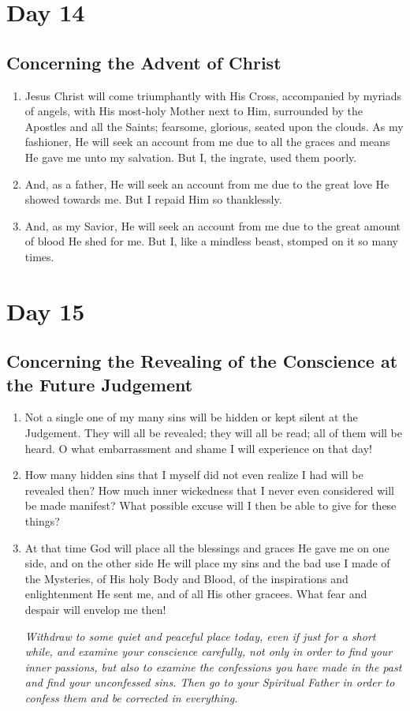 \documentclass[11pt]{article}
\begin{document}
\section*{Day 14}
\label{sec:orgdf59854}
\subsection*{Concerning the Advent of Christ}
\label{sec:org2060591}
\begin{enumerate}
\item Jesus Christ will come triumphantly with His Cross, accompanied by myriads of angels, with His most-holy Mother next to Him, surrounded by the Apostles and all the Saints; fearsome, glorious, seated upon the clouds. As my fashioner, He will seek an account from me due to all the graces and means He gave me unto my salvation. But I, the ingrate, used them poorly.
\item And, as a father, He will seek an account from me due to the great love He showed towards me. But I repaid Him so thanklessly.
\item And, as my Savior, He will seek an account from me due to the great amount of blood He shed for me. But I, like a mindless beast, stomped on it so many times.
\end{enumerate}
\section*{Day 15}
\label{sec:org88918b5}
\subsection*{Concerning the Revealing of the Conscience at the Future Judgement}
\label{sec:org435ac32}
\begin{enumerate}
\item Not a single one of my many sins will be hidden or kept silent at the Judgement. They will all be revealed; they will all be read; all of them will be heard. O what embarrassment and shame I will experience on that day!
\item How many hidden sins that I myself did not even realize I had will be revealed then? How much inner wickedness that I never even considered will be made manifest? What possible excuse will I then be able to give for these things?
\item At that time God will place all the blessings and graces He gave me on one side, and on the other side He will place my sins and the bad use I made of the Mysteries, of His holy Body and Blood, of the inspirations and enlightenment He sent me, and of all His other gracees. What fear and despair will envelop me then!

\emph{Withdraw to some quiet and peaceful place today, even if just for a short while, and examine your conscience carefully, not only in order to find your inner passions, but also to examine the confessions you have made in the past and find your unconfessed sins. Then go to your Spiritual Father in order to confess them and be corrected in everything.}
\end{enumerate}
\end{document}
